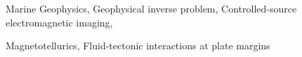 

\begin{cvparagraph}

Marine Geophysics, Geophysical inverse problem, Controlled-source electromagnetic imaging, 

Magnetotellurics, Fluid-tectonic interactions at plate margins

\end{cvparagraph}
